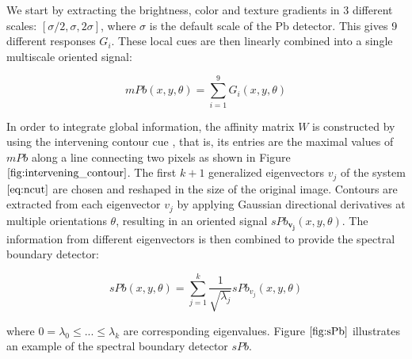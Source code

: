 \documentclass{SMBV12}
\begin{document}
We start by extracting the brightness, color and texture gradients in 3 different scales: $[\sigma/2, \sigma, 2\sigma]$, where $\sigma$ is the default scale of the Pb detector. This gives 9 different responses ${G_i}$. These local cues are then linearly combined into a single multiscale oriented signal:

\begin{equation}
mPb(x, y, \theta) = \sum\limits_{i = 1}^{9}G_i(x, y, \theta)
\end{equation}

In order to integrate global information, the affinity matrix $W$ is constructed by using the intervening contour cue \cite{leung1998contour}, that is, its entries are the maximal values of $mPb$ along a line connecting two pixels as shown in Figure $\ref{fig:intervening_contour}$. The first $k + 1$ generalized eigenvectors $v_j$ of the system $\ref{eq:ncut}$ are chosen and reshaped in the size of the original image. Contours are extracted from each eigenvector $v_j$ by applying Gaussian directional derivatives at multiple orientations $\theta$, resulting in an oriented signal $sPb_{\mathbf{v_j}}(x, y, \theta)$. The information from different eigenvectors is then combined to provide the spectral boundary detector:

\begin{equation}
sPb(x, y, \theta) = \sum\limits_{j=1}^{k}\dfrac{1}{\sqrt{\lambda_j}}sPb_{v_j}(x, y, \theta)
\end{equation}

where $0 = \lambda_0 \leq ... \leq \lambda_k$ are corresponding eigenvalues. Figure $\ref{fig:sPb}$ illustrates an example of the spectral boundary detector $sPb$.
\end{document}
